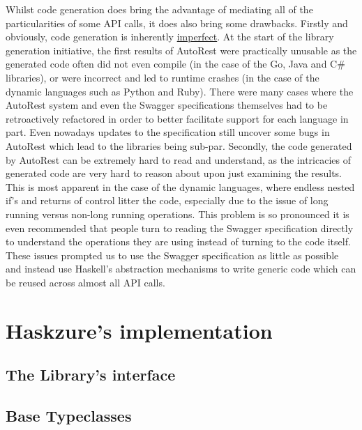\documentclass[11pt]{report}
\begin{document}
Whilst code generation does bring the advantage of mediating all of the
particularities of some API calls, it does also bring some drawbacks. \newline
Firstly and obviously, code generation is inherently \ul{imperfect}. At the
start of the library generation initiative, the first results of AutoRest
were practically unusable as the generated code often did not even compile (in the
case of the Go, Java and C\# libraries), or were incorrect and led to runtime
crashes (in the case of the dynamic languages such as Python and Ruby). There
were many cases where the AutoRest system and even the Swagger specifications
themselves had to be retroactively refactored in order to better facilitate
support for each language in part. Even nowadays updates to the specification
still uncover some bugs in AutoRest which lead to the libraries being sub-par.
\newline
Secondly, the code generated by AutoRest can be extremely hard to read and
understand, as the intricacies of generated code are very hard to reason about
upon just examining the results. This is most apparent in the case of the
dynamic languages, where endless nested if's and returns of control litter the
code, especially due to the issue of long running versus non-long running
operations. This problem is so pronounced it is even recommended that people
turn to reading the Swagger specification directly to understand the operations
they are using instead of turning to the code itself. \newline
These issues prompted us to use the Swagger specification as
little as possible and instead use Haskell's abstraction mechanisms to write generic
code which can be reused across almost all API calls.


\chapter{Haskzure's implementation}

\section{The Library's interface} %

\section{Base Typeclasses}
\end{document}
